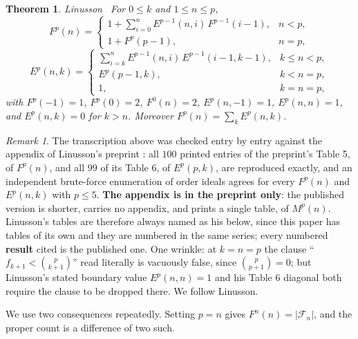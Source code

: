 \documentclass[11pt, a4paper, abstract=yes]{scrartcl}
\theoremstyle{definition}
\theoremstyle{remark}
\newtheorem{remark}[definition]{Remark}
\theoremstyle{plain}
\newtheorem{theorem}[definition]{Theorem}
\let\autocite\cite
\begin{document}
\begin{theorem}
Linusson~\cite[Theorem 3.2]{Linusson1999} For \(0\le k\) and \(1\le n\le p\),
\begin{equation}\label{eq:auto-8}
  F^p(n)=\begin{cases}
    1+\sum_{i=0}^{n}E^{p-1}(n,i)\,F^{p-1}(i-1), & n<p,\\
    1+F^p(p-1), & n=p,
  \end{cases}
\end{equation}
\begin{equation}\label{eq:auto-9}
  E^p(n,k)=\begin{cases}
    \sum_{i=k}^{n}E^{p-1}(n,i)\,E^{p-1}(i-1,k-1), & k\le n<p,\\
    E^p(p-1,k), & k<n=p,\\
    1, & k=n=p,
  \end{cases}
\end{equation}
with \(F^p(-1)=1\), \(F^p(0)=2\), \(F^0(n)=2\), \(E^p(n,-1)=1\), \(E^p(n,n)=1\), and
\(E^p(n,k)=0\) for \(k>n\). Moreover \(F^p(n)=\sum_kE^p(n,k)\).
\label{thm-linusson}
\end{theorem}

\begin{remark}
The transcription above was checked entry by entry against the appendix of Linusson's preprint
\autocite{Linusson1999preprint}: all \(100\)
printed entries of the preprint's Table 5, of \(F^p(n)\), and all \(99\) of its Table 6, of
\(E^p(p,k)\), are
reproduced exactly, and an
independent brute-force enumeration of order ideals agrees for every \(F^p(n)\) and
\(E^p(n,k)\) with \(p\le5\). \textbf{The appendix is in the preprint only}: the published version is
shorter, carries no appendix, and prints a single table, of \(M^p(n)\). Linusson's tables are
therefore always named as his below, since this paper has tables of its own and they are numbered
in the same series; every numbered \textbf{result} cited is the published one. One wrinkle: at \(k=n=p\) the clause
``\(f_{k+1}<\binom p{k+1}\)'' read literally is vacuously false, since \(\binom p{p+1}=0\); but
Linusson's stated boundary value \(E^p(n,n)=1\) and his Table 6 diagonal both require the clause to
be dropped there. We follow Linusson.
\label{rem-transcription}
\end{remark}

We use two consequences repeatedly. Setting \(p=n\) gives \(F^n(n)=|\mathcal F_n|\), and the
proper count is a difference of two such.
\end{document}
